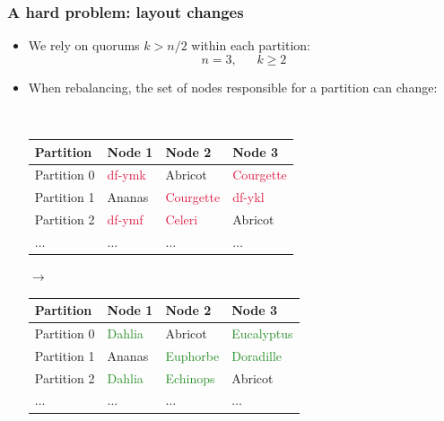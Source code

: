 \documentclass[aspectratio=169,xcolor={svgnames}]{beamer}
\begin{document}
\begin{frame}
	\frametitle{A hard problem: layout changes}
	\begin{itemize}
		\item We rely on quorums $k > n/2$ within each partition:\\
			$$n=3,~~~~~~~k\ge 2$$
		\item<2-> When rebalancing, the set of nodes responsible for a partition can change:\\

			\vspace{1em}
			\begin{minipage}{.04\linewidth}~
			\end{minipage}
			\begin{minipage}{.40\linewidth}
			{\tiny
				\begin{tabular}{|l|l|l|l|}
					\hline
					\textbf{Partition} & \textbf{Node 1} & \textbf{Node 2} & \textbf{Node 3} \\
					\hline
					\hline
					Partition 0 & \textcolor{Crimson}{df-ymk}  & Abricot  & \textcolor{Crimson}{Courgette} \\
					\hline
					Partition 1 & Ananas  & \textcolor{Crimson}{Courgette} & \textcolor{Crimson}{df-ykl}  \\
					\hline
					Partition 2 & \textcolor{Crimson}{df-ymf}  & \textcolor{Crimson}{Celeri} & Abricot  \\
					\hline
					\hspace{1em}$\dots$ & \hspace{1em}$\dots$ & \hspace{1em}$\dots$ & \hspace{1em}$\dots$ \\
					\hline
				\end{tabular}
			}
			\end{minipage}
			\begin{minipage}{.04\linewidth}
				$\to$
			\end{minipage}
			\begin{minipage}{.40\linewidth}
			{\tiny
				\begin{tabular}{|l|l|l|l|}
					\hline
					\textbf{Partition} & \textbf{Node 1} & \textbf{Node 2} & \textbf{Node 3} \\
					\hline
					\hline
					Partition 0 & \textcolor{ForestGreen}{Dahlia}  & Abricot  & \textcolor{ForestGreen}{Eucalyptus} \\
					\hline
					Partition 1 & Ananas  & \textcolor{ForestGreen}{Euphorbe}  & \textcolor{ForestGreen}{Doradille} \\
					\hline
					Partition 2 & \textcolor{ForestGreen}{Dahlia}  & \textcolor{ForestGreen}{Echinops} & Abricot  \\
					\hline
					\hspace{1em}$\dots$ & \hspace{1em}$\dots$ & \hspace{1em}$\dots$ & \hspace{1em}$\dots$ \\
					\hline
				\end{tabular}
			}
			\end{minipage}


\end{itemize}
\end{frame}
\end{document}
